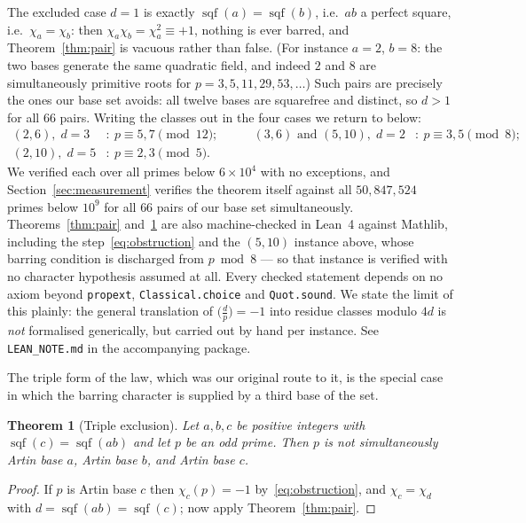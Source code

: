 \documentclass[11pt,reqno]{amsart}
\theoremstyle{plain}
\newtheorem{theorem}{Theorem}
\theoremstyle{definition}
\DeclareMathOperator{\sqf}{sqf}
\begin{document}
The excluded case $d = 1$ is exactly $\sqf(a) = \sqf(b)$, i.e.\ $ab$ a perfect
square, i.e.\ $\chi_a = \chi_b$: then $\chi_a \chi_b = \chi_a^2 \equiv +1$,
nothing is ever barred, and Theorem~\ref{thm:pair} is vacuous rather than
false. (For instance $a = 2$, $b = 8$: the two bases generate the same
quadratic field, and indeed $2$ and $8$ are simultaneously primitive roots for
$p = 3, 5, 11, 29, 53, \ldots$) Such pairs are precisely the ones our base set
avoids: all twelve bases are squarefree and distinct, so $d > 1$ for all $66$
pairs. Writing the classes out in the four cases we return to below:
\[
  \begin{aligned}
    (2,6),\; d = 3&\!: \ p \equiv 5, 7 \!\!\pmod{12}; &\qquad
    (3,6) \text{ and } (5,10),\; d = 2&\!: \ p \equiv 3, 5 \!\!\pmod 8; \\
    (2,10),\; d = 5&\!: \ p \equiv 2, 3 \!\!\pmod 5 .
  \end{aligned}
\]
We verified each over all primes below $6 \times 10^4$ with no exceptions, and
Section~\ref{sec:measurement} verifies the theorem itself against all
$50{,}847{,}524$ primes below $10^9$ for all $66$ pairs of our base set
simultaneously. Theorems~\ref{thm:pair} and~\ref{thm:triple} are also
machine-checked in Lean~4 against Mathlib, including the
step~\eqref{eq:obstruction} and the $(5,10)$ instance above, whose barring
condition is discharged from $p \bmod 8$ --- so that instance is verified with
no character hypothesis assumed at all. Every checked statement depends on no
axiom beyond \texttt{propext}, \texttt{Classical.choice} and
\texttt{Quot.sound}. We state the limit of this plainly: the general
translation of $\bigl(\tfrac{d}{p}\bigr) = -1$ into residue classes
modulo $4d$ is \emph{not} formalised generically, but carried out by hand per
instance. See \texttt{LEAN\_NOTE.md} in the accompanying package.

The triple form of the law, which was our original route to it, is the special
case in which the barring character is supplied by a third base of the set.

\begin{theorem}[Triple exclusion]
\label{thm:triple}
Let $a, b, c$ be positive integers with $\sqf(c) = \sqf(ab)$ and let $p$ be an
odd prime. Then $p$ is not simultaneously Artin base $a$, Artin base $b$, and
Artin base $c$.
\end{theorem}

\begin{proof}
If $p$ is Artin base $c$ then $\chi_c(p) = -1$ by~\eqref{eq:obstruction}, and
$\chi_c = \chi_d$ with $d = \sqf(ab) = \sqf(c)$; now apply
Theorem~\ref{thm:pair}.
\end{proof}
\end{document}
